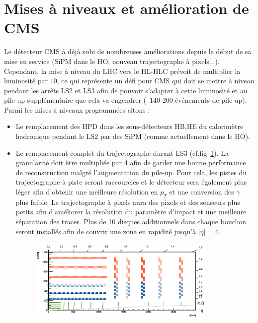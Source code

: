 \section{Mises à niveaux et amélioration de CMS}
Le détecteur CMS à déjà subi de nombreuses améliorations depuis le début de sa mise en service (SiPM dans le HO, nouveau trajectographe à pixels...). Cependant, la mise à niveau du LHC vers le HL-HLC prévoit de multiplier la luminosité par $10$, ce qui représente un défi pour CMS qui doit se mettre à niveau pendant les arrêts LS2 et LS3 afin de pouvoir s'adapter à cette luminosité et au pile-up supplémentaire que cela va engendrer (~140-200 événements de pile-up). Parmi les mises à niveaux programmées citons \cite{Collaboration:1355706} \cite{Contardo:2020886} :
\begin{itemize}[label=$\bullet$]
	\item Le remplacement des HPD dans les sous-détecteurs HB,HE du calorimètre hadronique pendant le LS2 par des SiPM (comme actuellement dans le HO).
	\item Le remplacement complet du trajectographe durant LS3 (cf.fig~\ref{tracker2}). La granularité doit être multipliée par 4 afin de garder une bonne performance de reconstruction malgré l'augmentation du pile-up. Pour cela, les pistes du trajectographe à piste seront raccourcies et le détecteur sera également plus léger afin d'obtenir une meilleure résolution en $p_{T}$ et une conversion des $\gamma$ plus faible. Le trajectographe à pixels aura des pixels et des senseurs plus petits afin d'améliorer la résolution du paramètre d'impact et une meilleure séparation des traces. Plus de 10 disques additionnels dans chaque bouchon seront installés afin de couvrir une zone en rapidité jusqu'à $|\eta|=4$.
	\begin{figure}[ht!]
		\centering
		\includegraphics[width=0.85\textwidth]{CMS/tracker2.png}
		\label{tracker2}
	\end{figure}

\end{itemize}
